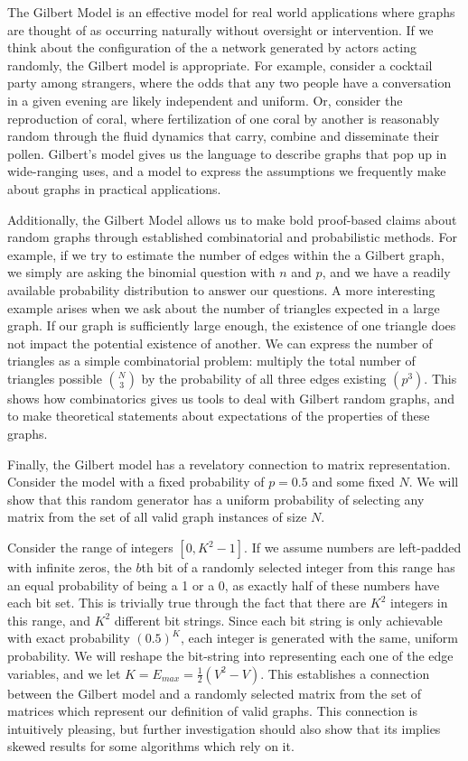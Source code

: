 \documentclass[11pt,a4paper]{report}
\begin{document}
The Gilbert Model is an effective model for real world applications where graphs are thought of as occurring naturally without oversight or intervention.
If we think about the configuration of the a network generated by actors acting randomly, the Gilbert model is appropriate.
For example, consider a cocktail party among strangers, where the odds that any two people have a conversation in a given evening are likely independent and uniform.
Or, consider the reproduction of coral, where fertilization of one coral by another is reasonably random through the fluid dynamics that carry, combine and disseminate their pollen.
Gilbert's model gives us the language to describe graphs that pop up in wide-ranging uses, and a model to express the assumptions we frequently make about graphs in practical applications.

Additionally, the Gilbert Model allows us to make bold proof-based claims about random graphs through established combinatorial and probabilistic methods.
For example, if we try to estimate the number of edges within the a Gilbert graph, we simply are asking the binomial question with $n$ and $p$, and we have a readily available probability distribution to answer our questions.
A more interesting example arises when we ask about the number of triangles expected in a large graph.
If our graph is sufficiently large enough, the existence of one triangle does not impact the potential existence of another.
We can express the number of triangles as a simple combinatorial problem: multiply the total number of triangles possible $\binom{N}{3}$ by the probability of all three edges existing $(p^3)$.
This shows how combinatorics gives us tools to deal with Gilbert random graphs, and to make theoretical statements about expectations of the properties of these graphs.

Finally, the Gilbert model has a revelatory connection to matrix representation.
Consider the model with a fixed probability of $p=0.5$ and some fixed $N$.
We will show that this random generator has a uniform probability of selecting any matrix from the set of all valid graph instances of size $N$.

Consider the range of integers $[0, K^2 - 1]$.
If we assume numbers are left-padded with infinite zeros, the $b$th bit of a randomly selected integer from this range has an equal probability of being a 1 or a 0, as exactly half of these numbers have each bit set.
This is trivially true through the fact that there are $K^2$ integers in this range, and $K^2$ different bit strings.
Since each bit string is only achievable with exact probability $(0.5)^K$, each integer is generated with the same, uniform probability.
We will reshape the bit-string into representing each one of the edge variables, and we let $K = E_{max} = \frac{1}{2}(V^2 - V)$.
This establishes a connection between the Gilbert model and a randomly selected matrix from the set of matrices which represent our definition of valid graphs. 
This connection is intuitively pleasing, but further investigation should also show that its implies skewed results for some algorithms which rely on it.
\end{document}
